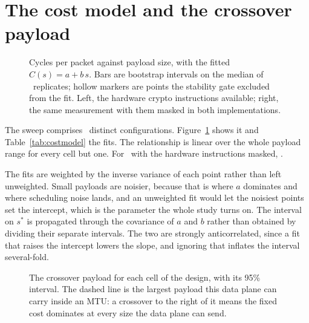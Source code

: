\section{The cost model and the crossover payload}
\label{sec:costmodel}

\begin{figure}[t]
\centering
{}
\caption{Cycles per packet against payload size, with the fitted
$C(s)=a+b\,s$. Bars are bootstrap intervals on the median of \envReplicates\
replicates; hollow markers are points the stability gate excluded from the fit.
Left, the hardware crypto instructions available; right, the same measurement
with them masked in both implementations.}
\label{fig:costmodel}
\end{figure}

\begin{table}[t]
\caption{Fitted cost model. $a$ is the payload-independent cost, $b$ the cost
per payload byte over a path that crosses the cipher twice, and $s^{*}=a/b$ the
crossover payload with its 95\% interval propagated through the parameter
covariance.}
\label{tab:costmodel}
\centering\footnotesize

\end{table}

The sweep comprises \eOneUnits\ distinct configurations.
Figure~\ref{fig:costmodel} shows it and Table~\ref{tab:costmodel} the fits. The
relationship is linear over the whole payload range for every cell but one. For
\bestCipher\ with the hardware instructions masked, \fitCurvatureLrAesGcmMasked.

The fits are weighted by the inverse variance of each point rather than left
unweighted. Small payloads are noisier, because that is where $a$ dominates and
where scheduling noise lands, and an unweighted fit would let the noisiest
points set the intercept, which is the parameter the whole study turns on. The
interval on $s^{*}$ is propagated through the covariance of $a$ and $b$ rather
than obtained by dividing their separate intervals. The two are strongly
anticorrelated, since a fit that raises the intercept lowers the slope, and
ignoring that inflates the interval several-fold.

\begin{figure}[t]
\centering
{}
\caption{The crossover payload for each cell of the design, with its 95\%
interval. The dashed line is the largest payload this data plane can carry
inside an MTU: a crossover to the right of it means the fixed cost dominates at
every size the data plane can send.}
\label{fig:crossover}
\end{figure}


